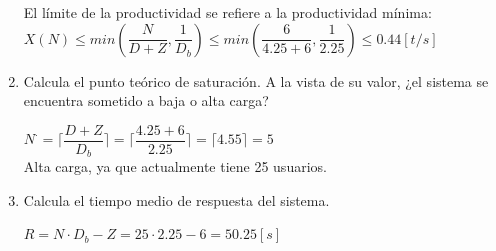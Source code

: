 \begin{enumerate}
\begin{tcolorbox}[colback=white,colframe=cyan!50!black,fonttitle=\bfseries]
    El límite de la productividad se refiere a la productividad mínima: \\
    $X(N)\leq min(\dfrac{N}{D+Z}, \dfrac{1}{D_b})\leq min(\dfrac{6}{4.25+6}, \dfrac{1}{2.25}) \leq 0.44 [t/s]$
    \end{tcolorbox}
    \item Calcula el punto teórico de saturación. A la vista de su valor, ¿el sistema se encuentra sometido a baja o alta carga?
    \begin{tcolorbox}[colback=white,colframe=cyan!50!black,fonttitle=\bfseries]
    $N^\cdot = \lceil \dfrac{D+Z}{D_b} \rceil = \lceil \dfrac{4.25+6}{2.25} \rceil = \lceil 4.55 \rceil = 5$\\
    Alta carga, ya que actualmente tiene 25 usuarios.
    \end{tcolorbox}
    \item Calcula el tiempo medio de respuesta del sistema.
    \begin{tcolorbox}[colback=white,colframe=cyan!50!black,fonttitle=\bfseries]
    $R=N\cdot D_b - Z = 25\cdot2.25-6=50.25[s]$
    \end{tcolorbox}
\end{enumerate}
